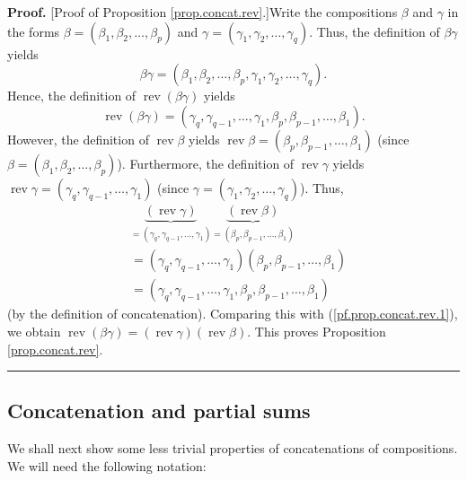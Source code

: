 \documentclass[numbers=enddot,12pt,final,onecolumn,notitlepage]{scrartcl}%
\theoremstyle{definition}
\newenvironment{proof}[1][Proof]{\noindent\textbf{#1.} }{\ \rule{0.5em}{0.5em}}
\begin{document}
\begin{proof}
[Proof of Proposition \ref{prop.concat.rev}.]Write the compositions $\beta$
and $\gamma$ in the forms $\beta=\left(  \beta_{1},\beta_{2},\ldots,\beta
_{p}\right)  $ and $\gamma=\left(  \gamma_{1},\gamma_{2},\ldots,\gamma
_{q}\right)  $. Thus, the definition of $\beta\gamma$ yields%
\[
\beta\gamma=\left(  \beta_{1},\beta_{2},\ldots,\beta_{p},\gamma_{1},\gamma
_{2},\ldots,\gamma_{q}\right)  .
\]
Hence, the definition of $\operatorname*{rev}\left(  \beta\gamma\right)  $
yields%
\begin{equation}
\operatorname*{rev}\left(  \beta\gamma\right)  =\left(  \gamma_{q}%
,\gamma_{q-1},\ldots,\gamma_{1},\beta_{p},\beta_{p-1},\ldots,\beta_{1}\right)
. \label{pf.prop.concat.rev.1}%
\end{equation}
However, the definition of $\operatorname*{rev}\beta$ yields
$\operatorname*{rev}\beta=\left(  \beta_{p},\beta_{p-1},\ldots,\beta
_{1}\right)  $ (since $\beta=\left(  \beta_{1},\beta_{2},\ldots,\beta
_{p}\right)  $). Furthermore, the definition of $\operatorname*{rev}\gamma$
yields $\operatorname*{rev}\gamma=\left(  \gamma_{q},\gamma_{q-1}%
,\ldots,\gamma_{1}\right)  $ (since $\gamma=\left(  \gamma_{1},\gamma
_{2},\ldots,\gamma_{q}\right)  $). Thus,%
\begin{align*}
&  \underbrace{\left(  \operatorname*{rev}\gamma\right)  }_{=\left(
\gamma_{q},\gamma_{q-1},\ldots,\gamma_{1}\right)  }\underbrace{\left(
\operatorname*{rev}\beta\right)  }_{=\left(  \beta_{p},\beta_{p-1}%
,\ldots,\beta_{1}\right)  }\\
&  =\left(  \gamma_{q},\gamma_{q-1},\ldots,\gamma_{1}\right)  \left(
\beta_{p},\beta_{p-1},\ldots,\beta_{1}\right) \\
&  =\left(  \gamma_{q},\gamma_{q-1},\ldots,\gamma_{1},\beta_{p},\beta
_{p-1},\ldots,\beta_{1}\right)
\end{align*}
(by the definition of concatenation). Comparing this with
(\ref{pf.prop.concat.rev.1}), we obtain $\operatorname*{rev}\left(
\beta\gamma\right)  =\left(  \operatorname*{rev}\gamma\right)  \left(
\operatorname*{rev}\beta\right)  $. This proves Proposition
\ref{prop.concat.rev}.
\end{proof}

\subsection{Concatenation and partial sums}

We shall next show some less trivial properties of concatenations of
compositions. We will need the following notation:
\end{document}
